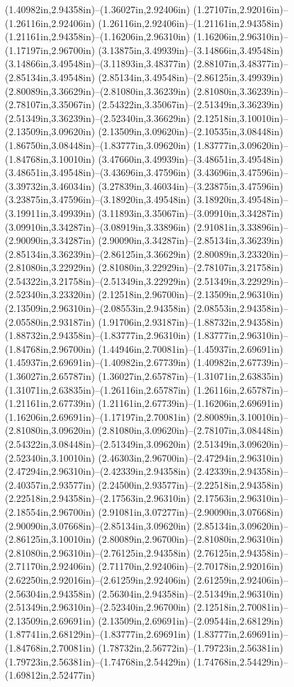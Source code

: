 (1.40982in,2.94358in)--(1.36027in,2.92406in) (1.27107in,2.92016in)--(1.26116in,2.92406in) (1.26116in,2.92406in)--(1.21161in,2.94358in) (1.21161in,2.94358in)--(1.16206in,2.96310in) (1.16206in,2.96310in)--(1.17197in,2.96700in) (3.13875in,3.49939in)--(3.14866in,3.49548in) (3.14866in,3.49548in)--(3.11893in,3.48377in) (2.88107in,3.48377in)--(2.85134in,3.49548in) (2.85134in,3.49548in)--(2.86125in,3.49939in) (2.80089in,3.36629in)--(2.81080in,3.36239in) (2.81080in,3.36239in)--(2.78107in,3.35067in) (2.54322in,3.35067in)--(2.51349in,3.36239in) (2.51349in,3.36239in)--(2.52340in,3.36629in) (2.12518in,3.10010in)--(2.13509in,3.09620in) (2.13509in,3.09620in)--(2.10535in,3.08448in) (1.86750in,3.08448in)--(1.83777in,3.09620in) (1.83777in,3.09620in)--(1.84768in,3.10010in) (3.47660in,3.49939in)--(3.48651in,3.49548in) (3.48651in,3.49548in)--(3.43696in,3.47596in) (3.43696in,3.47596in)--(3.39732in,3.46034in) (3.27839in,3.46034in)--(3.23875in,3.47596in) (3.23875in,3.47596in)--(3.18920in,3.49548in) (3.18920in,3.49548in)--(3.19911in,3.49939in) (3.11893in,3.35067in)--(3.09910in,3.34287in) (3.09910in,3.34287in)--(3.08919in,3.33896in) (2.91081in,3.33896in)--(2.90090in,3.34287in) (2.90090in,3.34287in)--(2.85134in,3.36239in) (2.85134in,3.36239in)--(2.86125in,3.36629in) (2.80089in,3.23320in)--(2.81080in,3.22929in) (2.81080in,3.22929in)--(2.78107in,3.21758in) (2.54322in,3.21758in)--(2.51349in,3.22929in) (2.51349in,3.22929in)--(2.52340in,3.23320in) (2.12518in,2.96700in)--(2.13509in,2.96310in) (2.13509in,2.96310in)--(2.08553in,2.94358in) (2.08553in,2.94358in)--(2.05580in,2.93187in) (1.91706in,2.93187in)--(1.88732in,2.94358in) (1.88732in,2.94358in)--(1.83777in,2.96310in) (1.83777in,2.96310in)--(1.84768in,2.96700in) (1.44946in,2.70081in)--(1.45937in,2.69691in) (1.45937in,2.69691in)--(1.40982in,2.67739in) (1.40982in,2.67739in)--(1.36027in,2.65787in) (1.36027in,2.65787in)--(1.31071in,2.63835in) (1.31071in,2.63835in)--(1.26116in,2.65787in) (1.26116in,2.65787in)--(1.21161in,2.67739in) (1.21161in,2.67739in)--(1.16206in,2.69691in) (1.16206in,2.69691in)--(1.17197in,2.70081in) (2.80089in,3.10010in)--(2.81080in,3.09620in) (2.81080in,3.09620in)--(2.78107in,3.08448in) (2.54322in,3.08448in)--(2.51349in,3.09620in) (2.51349in,3.09620in)--(2.52340in,3.10010in) (2.46303in,2.96700in)--(2.47294in,2.96310in) (2.47294in,2.96310in)--(2.42339in,2.94358in) (2.42339in,2.94358in)--(2.40357in,2.93577in) (2.24500in,2.93577in)--(2.22518in,2.94358in) (2.22518in,2.94358in)--(2.17563in,2.96310in) (2.17563in,2.96310in)--(2.18554in,2.96700in) (2.91081in,3.07277in)--(2.90090in,3.07668in) (2.90090in,3.07668in)--(2.85134in,3.09620in) (2.85134in,3.09620in)--(2.86125in,3.10010in) (2.80089in,2.96700in)--(2.81080in,2.96310in) (2.81080in,2.96310in)--(2.76125in,2.94358in) (2.76125in,2.94358in)--(2.71170in,2.92406in) (2.71170in,2.92406in)--(2.70178in,2.92016in) (2.62250in,2.92016in)--(2.61259in,2.92406in) (2.61259in,2.92406in)--(2.56304in,2.94358in) (2.56304in,2.94358in)--(2.51349in,2.96310in) (2.51349in,2.96310in)--(2.52340in,2.96700in) (2.12518in,2.70081in)--(2.13509in,2.69691in) (2.13509in,2.69691in)--(2.09544in,2.68129in) (1.87741in,2.68129in)--(1.83777in,2.69691in) (1.83777in,2.69691in)--(1.84768in,2.70081in) (1.78732in,2.56772in)--(1.79723in,2.56381in) (1.79723in,2.56381in)--(1.74768in,2.54429in) (1.74768in,2.54429in)--(1.69812in,2.52477in) 